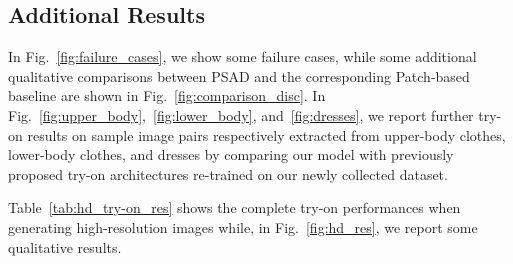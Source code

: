 \subsection*{Additional Results}

 In Fig.~\ref{fig:failure_cases}, we show some failure cases, while some additional qualitative comparisons between PSAD and the corresponding Patch-based baseline are shown in Fig.~\ref{fig:comparison_disc}. 
In Fig.~\ref{fig:upper_body},~\ref{fig:lower_body}, and~\ref{fig:dresses}, we report further try-on results on sample image pairs respectively extracted from upper-body clothes, lower-body clothes, and dresses by comparing our model with previously proposed try-on architectures re-trained on our newly collected dataset.

Table~\ref{tab:hd_try-on_res} shows the complete try-on performances when generating high-resolution images while, in Fig.~\ref{fig:hd_res}, we report some qualitative results.


